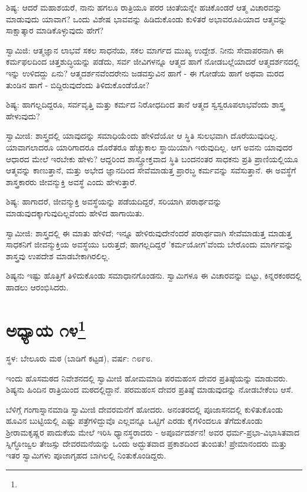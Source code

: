 ಶಿಷ್ಯ: ಆದರೆ ಮಹಾಶಯರೆ, ನಾನು ಹಗಲೂ ರಾತ್ರಿಯೂ ಪರರ ಚಿಂತೆಯನ್ನೇ ಹಚಿಕೊಂಡರೆ ಆತ್ಮ ವಿಚಾರವನ್ನು ಮಾಡುವುದು ಯಾವಾಗ? ಒಂದು ವಿಶೇಷ ಭಾವವನ್ನು ಹಿಡಿದುಕೊಂಡು ಕುಳಿತರೆ ಅಭಾವರೂಪಿಯಾದ ಆತ್ಮವನ್ನು ಸಾಕ್ಷಾತ್ಕಾರ ಮಾಡಿಕೊಳ್ಳುವುದು ಹೇಗೆ?

ಸ್ವಾಮಿಜಿ: ಆತ್ಮಜ್ಞಾನ ಲಾಭವೆ ಸಕಲ ಸಾಧನೆಯ, ಸಕಲ ಮಾರ್ಗದ ಮುಖ್ಯ ಉದ್ದೇಶ. ನೀನು ಸೇವಾಪರನಾಗಿ ಈ ಕರ್ಮಫಲದಿಂದ ಚಿತ್ತಶುದ್ಧಿಯನ್ನು ಪಡೆದು, ಸರ್ವ ಜೀವಿಗಳನ್ನೂ ಆತ್ಮದ ಹಾಗೆ ನೋಡಬಲ್ಲೆಯಾದರೆ ಆತ್ಮದರ್ಶನದಲ್ಲಿ ಇನ್ನು ಉಳಿದದ್ದು ಏನು? ಆತ್ಮದರ್ಶನವೆಂದರೇನು ಜಡವಸ್ತುವಿನ ಹಾಗೆ - ಈ ಗೋಡೆಯ ಹಾಗೆ ಅಥವಾ ಮರದ ತುಂಡಿನ ಹಾಗೆ - ಬಿದ್ದಿರುವುದೆಂದು ತಿಳಿದುಕೊಂಡೆಯೋ?

ಶಿಷ್ಯ: ಹಾಗಲ್ಲದಿದ್ದರೂ, ಸರ್ವವೃತ್ತಿ ಮತ್ತು ಕರ್ಮದ ನಿರೋಧದಿಂದ ತಾನೆ ಆತ್ಮದ ಸ್ವಸ್ವರೂಪಲಾಭವೆಂದು ಶಾಸ್ತ್ರ ಹೇಳುವುದು?

ಸ್ವಾಮೀಜಿ: ಶಾಸ್ತ್ರದಲ್ಲಿ ಯಾವುದನ್ನು ಸಮಾಧಿಯೆಂದು ಹೇಳಿದೆಯೋ ಆ ಸ್ಥಿತಿ ಸುಲಭವಾಗಿ ದೊರೆಯುವುದಿಲ್ಲ. ಯಾವಾಗಲಾದರೂ ಯಾರಿಗಾದರೂ ದೊರೆತರೂ ಹೆಚ್ಚುಕಾಲ ಸ್ಥಾಯಿಯಾಗಿ ಇರುವುದಿಲ್ಲ. ಆಗ ಅವನು ಯಾವುದರ ಆಧಾರದ ಮೇಲೆ ಇರಬೇಕು ಹೇಳು? ಆದ್ದರಿಂದ ಶಾಸ್ತ್ರೋಕ್ತವಾದ ಸ್ಥಿತಿ ಬಂದನಂತರ ಸಾಧಕನು ಪ್ರತಿ ಪ್ರಾಣಿಯಲ್ಲಿಯೂ ಆತ್ಮವನ್ನು ಕಾಣುತ್ತಾನೆ, ಮತ್ತು ಅಭೇದ ಜ್ಞಾನದಿಂದ ಸೇವೆಮಾಡುತ್ತ ಪ್ರಾರಬ್ಧ ಕರ್ಮವನ್ನು ಸವೆಸುತ್ತಾನೆ. ಈ ಅವಸ್ಥೆಗೆ ಶಾಸ್ತ್ರಕಾರರು ಜೀವನ್ಮುಕ್ತಿ ಅವಸ್ಥೆ ಎಂದು ಹೇಳುತ್ತಾರೆ.

ಶಿಷ್ಯ: ಹಾಗಾದರೆ, ಜೀವನ್ಮುಕ್ತಿ ಅವಸ್ಥೆಯನ್ನು ಪಡೆಯದಿದ್ದರೆ, ಸರಿಯಾಗಿ ಪರಾರ್ಥವನ್ನು ಮಾಡುವುದಕ್ಕಾಗುವುದಿಲ್ಲವೆಂದು ಹೇಳಿದ ಹಾಗಾಯಿತು.

ಸ್ವಾಮೀಜಿ: ಶಾಸ್ತ್ರದಲ್ಲಿ ಈ ಮಾತು ಹೇಳಿದೆ; ಇನ್ನೂ ಹೇಳಿರುವುದೇನೆಂದರೆ ಪರಾರ್ಥವಾಗಿ ಸೇವೆಮಾಡುತ್ತ ಮಾಡುತ್ತ ಸಾಧಕನಿಗೆ ಜೀವನ್ಮುಕ್ತಿಯ ಅವಸ್ಥೆಯು ಬರುತ್ತದೆ; ಹಾಗಲ್ಲದಿದ್ದರೆ 'ಕರ್ಮಯೋಗ'ವೆಂದು ಬೇರೊಂದು ಮಾರ್ಗವನ್ನು ಶಾಸ್ತ್ರವು ಉಪದೇಶ ಮಾಡಬೇಕಾಗಿರಲಿಲ್ಲ.

ಶಿಷ್ಯನು ಇಷ್ಟು ಹೊತ್ತಿಗೆ ತಿಳಿದುಕೊಂಡು ಸಮಾಧಾನಗೊಂಡನು. ಸ್ವಾಮಿಗಳೂ ಈ ವಿಚಾರವನ್ನು ಬಿಟ್ಟು, ಕಿನ್ನರಕಂಠದಲ್ಲಿ ಹಾಡಲು ಆರಂಭಿಸಿದರು.

\newpage

\chapter[ಅಧ್ಯಾಯ ೧೪]{ಅಧ್ಯಾಯ ೧೪\protect\footnote{}}

\begin{center}
ಸ್ಥಳ: ಬೇಲೂರು ಮಠ (ಬಾಡಿಗೆ ಕಟ್ಟಡ), ವರ್ಷ: ೧೮೯೮.
\end{center}

ಇಂದು ಹೊಸಮಠದ ನಿವೇಶನದಲ್ಲಿ ಸ್ವಾಮೀಜಿ ಹೋಮಮಾಡಿ ಪರಮಹಂಸ ದೇವರ ಪ್ರತಿಷ್ಠೆಯನ್ನು ಮಾಡುವರು. ಶಿಷ್ಯನು ಹಿಂದಿನ ರಾತ್ರಿಯಿಂದ ಮಠದಲ್ಲಿದ್ದಾನೆ. ಪರಮಹಂಸ ದೇವರ ಪ್ರತಿಷ್ಠೆ ಮಾಡುವುದನ್ನು ನೋಡಬೇಕೆಂಬ ಆಸೆ.

ಬೆಳಿಗ್ಗೆ ಗಂಗಾಸ್ನಾನಮಾಡಿ ಸ್ವಾಮೀಜಿ ದೇವರಮನೆಗೆ ಹೋದರು. ಅನಂತರದಲ್ಲಿ ಪೂಜಾಸನದಲ್ಲಿ ಕುಳಿತುಕೊಂಡು ಹೂವಿನ ಬುಟ್ಟಿಯಲ್ಲಿ ಎಷ್ಟು ಪತ್ರೆಗಳಿದ್ದುವೊ ಎಲ್ಲವನ್ನೂ ಒಟ್ಟಿಗೆ ಎರಡು ಕೈಗಳಿಂದಲೂ ತೆಗೆದುಕೊಂಡು ಶ‍್ರೀರಾಮಕೃಷ್ಣರ ಪಾದುಕೆಯ ಮೇಲೆ ಇರಿಸಿ ಧ್ಯಾನಸ್ಥರಾದರು - ಅಪೂರ್ವದರ್ಶನ! ಅವರ ಧರ್ಮ-ಪ್ರಭಾ-ವಿಭಾಸಿತವಾದ ಸ್ನಿಗ್ಧೋಜ್ವಲ ತೇಜಸ್ಸು ದೇವರಮನೆಯನ್ನು ಒಂದು ಅದ್ಭುತವಾದ ಪ್ರಕಾಶದಿಂದ ತುಂಬಿತು! ಪ್ರೇಮಾನಂದರು ಮತ್ತು ಇತರ ಸ್ವಾಮಿಗಳು ಪೂಜಾಗೃಹದ ಬಾಗಿಲಲ್ಲಿ ನಿಂತುಕೊಂಡಿದ್ದರು.

